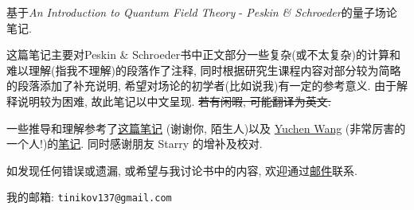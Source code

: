 
\begin{spacing}{1.8}
  基于\textit{An Introduction to Quantum Field Theory} - \textit{Peskin \& Schroeder}的量子场论笔记.

  \mbox{}

  这篇笔记主要对Peskin \& Schroeder书中正文部分一些复杂(或不太复杂)的计算和难以理解(指我不理解)的段落作了注释, 同时根据研究生课程内容对部分较为简略的段落添加了补充说明, 希望对场论的初学者(比如说我)有一定的参考意义.
  由于解释说明较为困难, 故此笔记以中文呈现.
  \sout{若有闲暇, 可能翻译为英文. }

  \mbox{}

  一些推导和理解参考了\href{http://gamebm.shoutwiki.com/wiki/Lecture_Notes_of_An_Introduction_to_Quantum_Field_Theory_by_M._Peskin_and_D._Schroeder}{这篇笔记} (谢谢你, 陌生人)以及 \href{https://yuchenw.blog}{Yuchen Wang} (非常厉害的一个人!)的\href{https://yuchenw.blog/qft-notes}{笔记}.
  同时感谢朋友 Starry 的增补及校对.

  \mbox{}

  如发现任何错误或遗漏, 或希望与我讨论书中的内容, 欢迎通过\href{mailto:tinikov137@gmail.com}{邮件}联系.

  我的邮箱: \texttt{tinikov137@gmail.com}
\end{spacing}
\pagestyle{general}